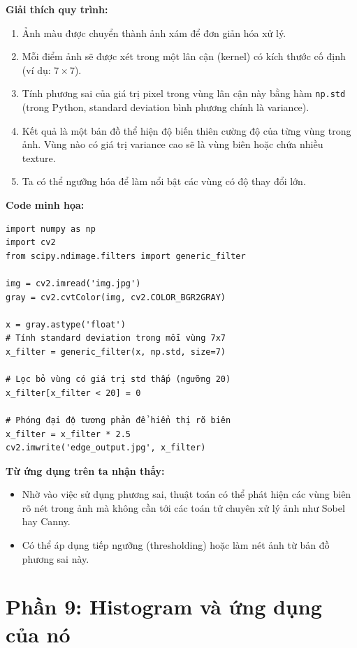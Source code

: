 \documentclass[11pt]{article}
\begin{document}
\vspace{1em}


\textbf{Giải thích quy trình:}
\begin{enumerate}
    \item Ảnh màu được chuyển thành ảnh xám để đơn giản hóa xử lý.
    \item Mỗi điểm ảnh sẽ được xét trong một lân cận (kernel) có kích thước cố định (ví dụ: $7 \times 7$).
    \item Tính phương sai của giá trị pixel trong vùng lân cận này bằng hàm \texttt{np.std} (trong Python, standard deviation bình phương chính là variance).
    \item Kết quả là một bản đồ thể hiện độ biến thiên cường độ của từng vùng trong ảnh. Vùng nào có giá trị variance cao sẽ là vùng biên hoặc chứa nhiều texture.
    \item Ta có thể ngưỡng hóa để làm nổi bật các vùng có độ thay đổi lớn.
\end{enumerate}

\textbf{Code minh họa:}

\begin{verbatim}
import numpy as np
import cv2
from scipy.ndimage.filters import generic_filter

img = cv2.imread('img.jpg')
gray = cv2.cvtColor(img, cv2.COLOR_BGR2GRAY)

x = gray.astype('float')
# Tính standard deviation trong mỗi vùng 7x7
x_filter = generic_filter(x, np.std, size=7)

# Lọc bỏ vùng có giá trị std thấp (ngưỡng 20)
x_filter[x_filter < 20] = 0

# Phóng đại độ tương phản để hiển thị rõ biên
x_filter = x_filter * 2.5
cv2.imwrite('edge_output.jpg', x_filter)
\end{verbatim}

\begin{summarybox}
    \textbf{Từ ứng dụng trên ta nhận thấy:}
    \begin{itemize}
    \item Nhờ vào việc sử dụng phương sai, thuật toán có thể phát hiện các vùng biên rõ nét trong ảnh mà không cần tới các toán tử chuyên xử lý ảnh như Sobel hay Canny.
    \item Có thể áp dụng tiếp ngưỡng (thresholding) hoặc làm nét ảnh từ bản đồ phương sai này. 
    \end{itemize}
\end{summarybox} 


\section{Phần 9: Histogram và ứng dụng của nó}
\end{document}
